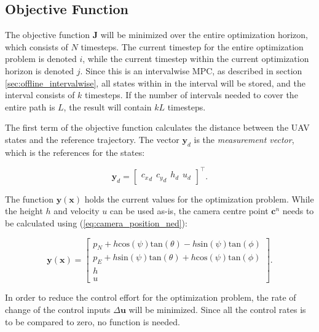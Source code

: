 \subsection{Objective Function}

The objective function $\mathbf{J}$ will be minimized over the entire optimization horizon, which consists of $N$ timesteps. The current timestep for the entire optimization problem is denoted $i$, while the current timestep within the current optimization horizon is denoted $j$. Since this is an intervalwise MPC, as described in section \ref{sec:offline_intervalwise}, all states within in the interval will be stored, and the interval consists of $k$ timesteps. If the number of intervals needed to cover the entire path is $L$, the result will contain $kL$ timesteps.

The first term of the objective function calculates the distance between the UAV states and the reference trajectory. The vector $\mathbf{y}_d$ is the \textit{measurement vector}, which is the references for the states:
	
\begin{equation}
	\mathbf{y}_d =
	\begin{bmatrix}
		{c_x}_d \hspace{5pt} {c_y}_d \hspace{5pt} h_d \hspace{5pt} u_d
	\end{bmatrix}^\intercal .
\end{equation}

The function $\mathbf{y}(\mathbf{x})$ holds the current values for the optimization problem. While the height $h$ and velocity $u$ can be used as-is, the camera centre point $\mathbf{c}^n$ needs to be calculated using (\ref{eq:camera_position_ned}):

\begin{equation}
	\mathbf{y}(\mathbf{x}) =
	\begin{bmatrix}
		p_N + h\text{cos}(\psi)\text{tan}(\theta) - h\text{sin}(\psi)\text{tan}(\phi)\\
		p_E + h\text{sin}(\psi)\text{tan}(\theta) + h\text{cos}(\psi)\text{tan}(\phi)\\
		h \\
		u
	\end{bmatrix}.
\end{equation}

In order to reduce the control effort for the optimization problem, the rate of change of the control inputs $\Delta\mathbf{u}$ will be minimized. Since all the control rates is to be compared to zero, no function is needed.

